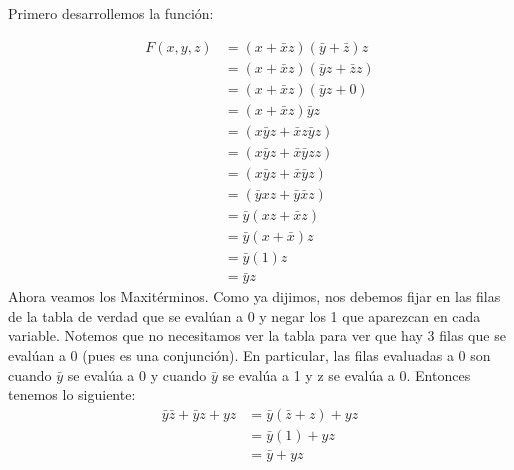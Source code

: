 \documentclass[answers]{exam}
\begin{document}
\begin{questions}
   \vspace{-2em}
  \begin{solution}
    Primero desarrollemos la función:

    \begin{align*}
      F(x, y, z) &= (x + \bar{x}z)(\bar{y} + \bar{z})z\\
                 &= (x + \bar{x}z)(\bar{y}z + \bar{z}z) \tag{por Distributividad}\\
                 &= (x + \bar{x}z)(\bar{y}z + 0) \tag{por Complemento}\\
                 &= (x + \bar{x}z)\bar{y}z \tag{por identidad}\\
                 &= (x\bar{y}z + \bar{x}z\bar{y}z) \tag{por Distributividad}\\
                 &= (x\bar{y}z + \bar{x}\bar{y}zz) \tag{por Conmutatividad}\\
                 &= (x\bar{y}z + \bar{x}\bar{y}z) \tag{por Idempotencia}\\
                 &= (\bar{y}xz + \bar{y}\bar{x}z) \tag{por Conmutatividad}\\
                 &= \bar{y}(xz + \bar{x}z) \tag{por Distributividad}\\
                 &= \bar{y}(x + \bar{x})z \tag{por Distributividad}\\
                 &= \bar{y}(1)z \tag{por Complemento}\\
                 &= \bar{y}z \tag{por Identidad}
    \end{align*}
    Ahora veamos los Maxitérminos. Como ya dijimos, nos debemos fijar en las
    filas de la tabla de verdad que se evalúan a 0 y negar los 1 que aparezcan
    en cada variable. Notemos que no necesitamos ver la tabla para ver que hay 3
    filas que se evalúan a 0 (pues es una conjunción). En particular, las filas
    evaluadas a 0 son cuando $\bar{y}$ se evalúa a 0 y cuando $\bar{y}$ se
    evalúa a 1 y z se evalúa a 0. Entonces tenemos lo siguiente:
    \begin{align*}
      \bar{y}\bar{z} + \bar{y}z + yz &= \bar{y}(\bar{z} + z) + yz
                                       \tag{por Distributividad}\\
                                     &= \bar{y}(1) + yz \tag{por Complemento}\\
                                     &= \bar{y} + yz \tag{por Identidad}
    \end{align*}
  \end{solution}


\end{questions}
\end{document}
